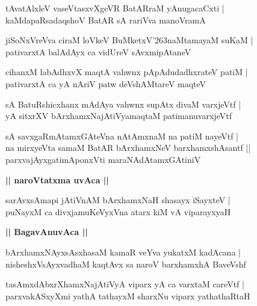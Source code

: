 \documentclass[twoside,12pt,openright]{book}
\def\S{\char'263}
\newcounter{shloka}[chapter]
\def\uvaca#1{\centerline{{\large\textbf{#1}}}}
\begin{document}
\begin{shloka}%
tAvatAlxleV vaseVtasxvXgeVR BatARraM yAnugacaCxti |\\
kaMdapaRsadaqshoV BatAR sA rariVva manoVramA 
\end{shloka}

\begin{shloka}%
jiSoNxVreVva ciraM loVkeV BuMketxV\S naMtamayaM suKaM |\\
pativarxtA balAdAyx ca vidUreV sAvxmipAtaneV 
\end{shloka}

\begin{shloka}%
cihanxM labAdhxvX maqtA vahwnx pApAdudadhxrateV patiM |\\
pativarxtA ca yA nAriV patw deVshAMtareV maqteV 
\end{shloka}

\begin{shloka}%
sA BatuRshicxhanx mAdAya vahwnx supAtx divaM varxjeVtf |\\
yA sitxrXV bArxhamxNajAtiVyamaqtaM patimanuvarxjeVtf
\end{shloka}

\begin{shloka}%
sA savxgaRmAtamxGAteVna nAtAmxnaM na patiM nayeVtf |\\
na mirxyeVta samaM BatAR bArxhamxNeV barxhamxshAsantf ||\\
parxvajAyxgatimAponxVti maraNAdAtamxGAtiniV
\end{shloka}

\uvaca{|| naroVtatxma uvAca ||}

\begin{shloka}%
sarAvxsAmapi jAtiVnAM bArxhamxNaH shasayx iSayxteV |\\
puNayxM ca divxjamuKeVyxVna atarx kiM vA viparayxyaH 
\end{shloka}

\uvaca{|| BagavAnuvAca ||}

\begin{shloka}%
bArxhamxNAyxsAsxhasaM kamaR veYva yukatxM kadAcana |\\
nisheshxVsAyxvadhaM kaqtAvx sa naroV barxhamxhA BaveVshf
\end{shloka}

\begin{shloka}%
tasAmxdAbxrXhamxNajAtiVyA viparx yA ca varxtaM careVtf |\\
parxvakASxyXmi yathA tathayxM sharxNu viparx yathathaRtaH
\end{shloka}
\end{document}
